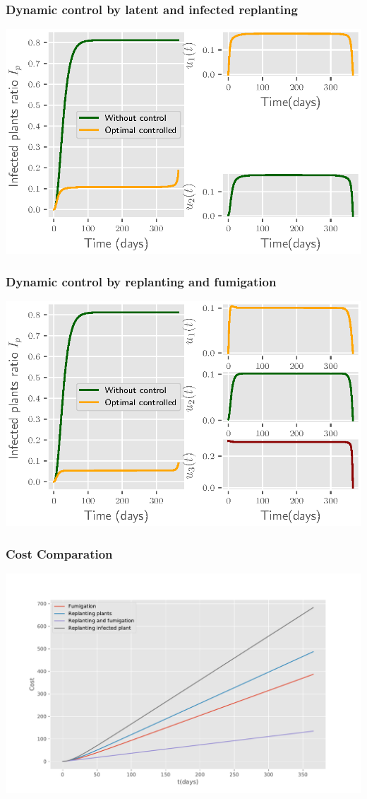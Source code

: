 	\begin{frame}[plain]
		\frametitle{Dynamic control by latent and infected replanting}
			\centering	
			\includegraphics[]{Feathergraphics/two_control_simulation_1.eps}
	
	\end{frame}
	\begin{frame}[plain]
			\frametitle{Dynamic control by replanting and fumigation}
			\centering	
			\includegraphics[]{Feathergraphics/three_controls_simulation_1.eps}
	
	\end{frame}

\begin{frame}[plain]

		\frametitle{Cost Comparation}
		\centering	
		\includegraphics[scale=0.5]{Feathergraphics/Cost_Comparation_version_2.pdf}
	
\end{frame}
